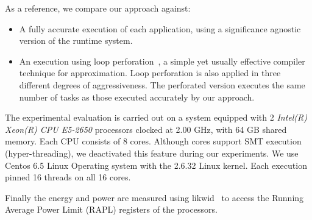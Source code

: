As a reference, we compare
our approach against:
\begin{itemize}
	\item A fully accurate execution of each application, using a significance agnostic version of the runtime system. 
    \item An execution using loop perforation~\cite{Sidiroglou-Douskos:2011:MPV:2025113.2025133}, a simple yet usually effective compiler technique for approximation. Loop perforation is also applied in three different degrees of aggressiveness. The perforated version executes the same number of tasks as those executed accurately by our approach.
\end{itemize}

The experimental evaluation is carried out on a system equipped with 2 \textit{Intel(R) Xeon(R) CPU E5-2650} processors clocked at 2.00 GHz, with 64 GB shared memory. Each CPU consists of 8 cores. Although cores support SMT execution (hyper-threading), we deactivated this feature during our experiments. We use Centos 6.5 Linux Operating system with the  2.6.32 Linux kernel. Each execution pinned 16 threads on all 16 cores.

Finally the energy and power are measured using likwid~\cite{treibig2010likwid} to access the Running Average Power Limit (RAPL) registers of the processors.

